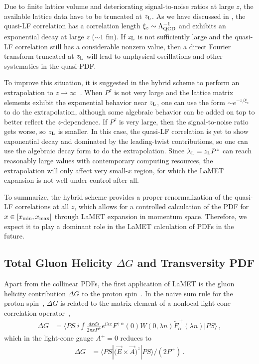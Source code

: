 Due to finite lattice volume and deteriorating signal-to-noise ratios at large $z$, the available lattice data have to be truncated at  $z_{\rm L}$.
As we have discussed in , the quasi-LF correlation has a correlation length $\xi_z\sim \Lambda_{\rm QCD}^{-1}$ and exhibits an exponential decay at large $z$ ($\sim 1$ fm). If $z_{\rm L}$ is not sufficiently large and the quasi-LF correlation still has a considerable nonzero value, then a direct Fourier transform truncated at $z_{\rm L}$ will lead to unphysical oscillations and other systematics in the quasi-PDF.

To improve this situation, it is suggested in the hybrid scheme to perform an extrapolation to $z\to\infty$~\cite{Ji:2020brr}. When $P^z$ is not very large and the lattice matrix elements exhibit the exponential behavior near $z_{\rm L}$, one can use the form $\sim e^{-z/\xi_z}$ to do the extrapolation, although some algebraic behavior can be added on top to better reflect the $z$-dependence. If $P^z$ is very large, then the signal-to-noise ratio gets worse, so $z_{\rm L}$ is smaller. In this case, the quasi-LF correlation is yet to show exponential decay and dominated by the leading-twist contributions, so one can use the algebraic decay form to do the extrapolation. Since $\lambda_{\rm L} =z_{\rm L}P^z$ can reach reasonably large values with contemporary computing resources, the extrapolation will only affect very small-$x$ region, for which the LaMET expansion is not well under control after all.

To summarize, the hybrid scheme provides a proper renormalization of the quasi-LF correlations at all $z$, which allows for a controlled calculation of the PDF for $x\in[x_{\rm min}, x_{\rm max}]$ through LaMET expansion in momentum space. Therefore,  we expect it to play a dominant role in the LaMET calculation of PDFs in the future.

\subsection{Total Gluon Helicity $\Delta G$ and Transversity PDF}
\label{sec:deltaG}

Apart from the collinear PDFs, the first application of LaMET is the gluon helicity contribution $\Delta G$ to the proton spin~\cite{Ji:2013fga}. In the naive sum rule for the proton spin~\cite{Jaffe:1989jz}, $\Delta G$ is related to the matrix element of a nonlocal light-cone correlation operator~\cite{Manohar:1990jx},
\begin{align}\label{eq:sginv}
	\Delta G &\!=\! \langle PS\big|i\!\int\! \frac{dxd\lambda}{2\pi xP^+} e^{i\lambda x} \! F^{+\alpha}(0) W(0,\!\lambda n)\tilde F_{\alpha}^{~+} (\lambda n)\big|PS\rangle\,,
\end{align}
which in the light-cone gauge $A^+=0$ reduces to
\begin{align}
	\Delta G &= \langle PS| \big(\vec{E}\times \vec{A}\big)^z|PS\rangle /(2P^+)\,.
\end{align}

